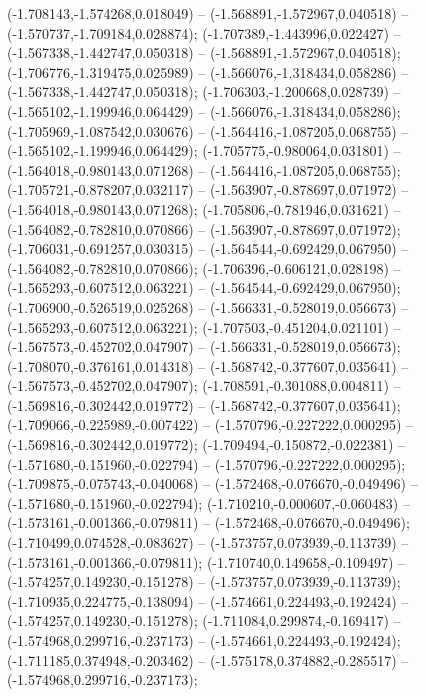  (-1.708143,-1.574268,0.018049) -- (-1.568891,-1.572967,0.040518) -- (-1.570737,-1.709184,0.028874);
 (-1.707389,-1.443996,0.022427) -- (-1.567338,-1.442747,0.050318) -- (-1.568891,-1.572967,0.040518);
 (-1.706776,-1.319475,0.025989) -- (-1.566076,-1.318434,0.058286) -- (-1.567338,-1.442747,0.050318);
 (-1.706303,-1.200668,0.028739) -- (-1.565102,-1.199946,0.064429) -- (-1.566076,-1.318434,0.058286);
 (-1.705969,-1.087542,0.030676) -- (-1.564416,-1.087205,0.068755) -- (-1.565102,-1.199946,0.064429);
 (-1.705775,-0.980064,0.031801) -- (-1.564018,-0.980143,0.071268) -- (-1.564416,-1.087205,0.068755);
 (-1.705721,-0.878207,0.032117) -- (-1.563907,-0.878697,0.071972) -- (-1.564018,-0.980143,0.071268);
 (-1.705806,-0.781946,0.031621) -- (-1.564082,-0.782810,0.070866) -- (-1.563907,-0.878697,0.071972);
 (-1.706031,-0.691257,0.030315) -- (-1.564544,-0.692429,0.067950) -- (-1.564082,-0.782810,0.070866);
 (-1.706396,-0.606121,0.028198) -- (-1.565293,-0.607512,0.063221) -- (-1.564544,-0.692429,0.067950);
 (-1.706900,-0.526519,0.025268) -- (-1.566331,-0.528019,0.056673) -- (-1.565293,-0.607512,0.063221);
 (-1.707503,-0.451204,0.021101) -- (-1.567573,-0.452702,0.047907) -- (-1.566331,-0.528019,0.056673);
 (-1.708070,-0.376161,0.014318) -- (-1.568742,-0.377607,0.035641) -- (-1.567573,-0.452702,0.047907);
 (-1.708591,-0.301088,0.004811) -- (-1.569816,-0.302442,0.019772) -- (-1.568742,-0.377607,0.035641);
 (-1.709066,-0.225989,-0.007422) -- (-1.570796,-0.227222,0.000295) -- (-1.569816,-0.302442,0.019772);
 (-1.709494,-0.150872,-0.022381) -- (-1.571680,-0.151960,-0.022794) -- (-1.570796,-0.227222,0.000295);
 (-1.709875,-0.075743,-0.040068) -- (-1.572468,-0.076670,-0.049496) -- (-1.571680,-0.151960,-0.022794);
 (-1.710210,-0.000607,-0.060483) -- (-1.573161,-0.001366,-0.079811) -- (-1.572468,-0.076670,-0.049496);
 (-1.710499,0.074528,-0.083627) -- (-1.573757,0.073939,-0.113739) -- (-1.573161,-0.001366,-0.079811);
 (-1.710740,0.149658,-0.109497) -- (-1.574257,0.149230,-0.151278) -- (-1.573757,0.073939,-0.113739);
 (-1.710935,0.224775,-0.138094) -- (-1.574661,0.224493,-0.192424) -- (-1.574257,0.149230,-0.151278);
 (-1.711084,0.299874,-0.169417) -- (-1.574968,0.299716,-0.237173) -- (-1.574661,0.224493,-0.192424);
 (-1.711185,0.374948,-0.203462) -- (-1.575178,0.374882,-0.285517) -- (-1.574968,0.299716,-0.237173);
